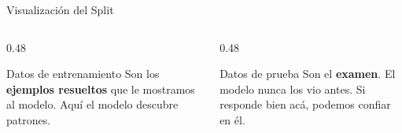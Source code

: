 \documentclass[aspectratio=169]{beamer}
\begin{document}
\begin{frame}{Visualización del Split}
  \centering
  \vspace{0.3cm}


  \vspace{0.8cm}
  \begin{columns}[T]
    \begin{column}{0.48\textwidth}
      \begin{conceptbox}{\faGraduationCap\enspace Datos de entrenamiento}
        \small
        Son los \textbf{ejemplos resueltos} que le mostramos al modelo. Aquí el modelo descubre patrones.
      \end{conceptbox}
    \end{column}
    \begin{column}{0.48\textwidth}
      \begin{alertblock}{\faClipboardCheck\enspace Datos de prueba}
        \small
        Son el \textbf{examen}. El modelo nunca los vio antes. Si responde bien acá, podemos confiar en él.
      \end{alertblock}
    \end{column}
  \end{columns}
\end{frame}

\end{document}
